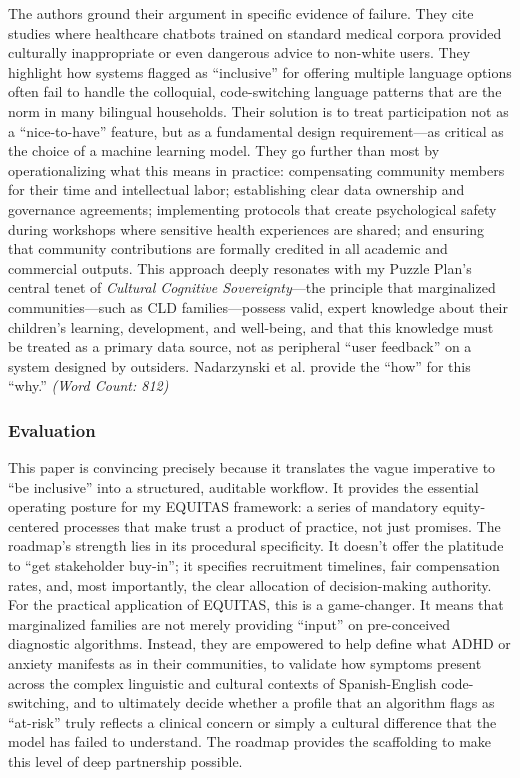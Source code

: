 \documentclass[11pt,twoside]{article}
\begin{document}
The authors ground their argument in specific evidence of failure. They cite studies where healthcare chatbots trained on standard medical corpora provided culturally inappropriate or even dangerous advice to non-white users. They highlight how systems flagged as “inclusive” for offering multiple language options often fail to handle the colloquial, code-switching language patterns that are the norm in many bilingual households. Their solution is to treat participation not as a “nice-to-have” feature, but as a fundamental design requirement—as critical as the choice of a machine learning model. They go further than most by operationalizing what this means in practice: compensating community members for their time and intellectual labor; establishing clear data ownership and governance agreements; implementing protocols that create psychological safety during workshops where sensitive health experiences are shared; and ensuring that community contributions are formally credited in all academic and commercial outputs. This approach deeply resonates with my Puzzle Plan’s central tenet of \textit{Cultural Cognitive Sovereignty}—the principle that marginalized communities—such as CLD families—possess valid, expert knowledge about their children’s learning, development, and well-being, and that this knowledge must be treated as a primary data source, not as peripheral “user feedback” on a system designed by outsiders. Nadarzynski et al. provide the “how” for this “why.” \textit{(Word Count: 812)}

\newpage
\subsubsection*{Evaluation}

\vspace{-0.3cm}
This paper is convincing precisely because it translates the vague imperative to “be inclusive” into a structured, auditable workflow. It provides the essential operating posture for my EQUITAS framework: a series of mandatory equity-centered processes that make trust a product of practice, not just promises. The roadmap’s strength lies in its procedural specificity. It doesn’t offer the platitude to “get stakeholder buy-in”; it specifies recruitment timelines, fair compensation rates, and, most importantly, the clear allocation of decision-making authority. For the practical application of EQUITAS, this is a game-changer. It means that marginalized families are not merely providing “input” on pre-conceived diagnostic algorithms. Instead, they are empowered to help define what ADHD or anxiety manifests as in their communities, to validate how symptoms present across the complex linguistic and cultural contexts of Spanish-English code-switching, and to ultimately decide whether a profile that an algorithm flags as “at-risk” truly reflects a clinical concern or simply a cultural difference that the model has failed to understand. The roadmap provides the scaffolding to make this level of deep partnership possible.
\end{document}
